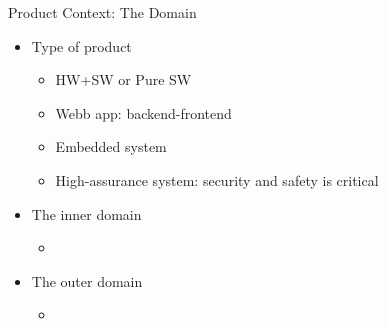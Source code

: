 
\begin{Slide}{Product Context: The Domain}

\begin{itemize}
\item Type of product
\begin{itemize}
\item HW+SW or Pure SW
\item Webb app: backend-frontend
\item Embedded system
\item High-assurance system: security and safety is critical
\end{itemize}
\item The inner domain
\begin{itemize}
\item \TODO{}
\end{itemize}
\item The outer domain
\begin{itemize}
\item \TODO{}

\end{itemize}
\end{itemize}
\end{Slide}